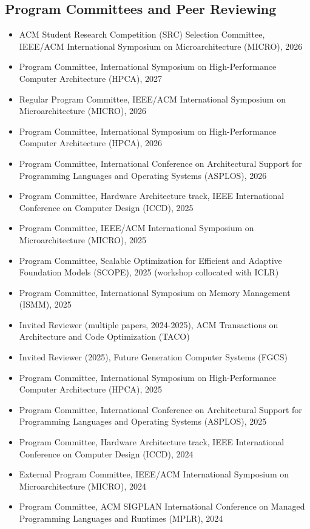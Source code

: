 \documentclass[singlecolumn,singlespace,11pt,a4paper]{article}
\begin{document}
\subsection*{Program Committees and Peer Reviewing}
\begin{itemize}
\item ACM Student Research Competition (SRC) Selection Committee, IEEE/ACM International Symposium on Microarchitecture (MICRO), 2026
\item Program Committee, International Symposium on High-Performance Computer Architecture (HPCA), 2027
\item Regular Program Committee, IEEE/ACM International Symposium on Microarchitecture (MICRO), 2026
\item Program Committee, International Symposium on High-Performance Computer Architecture (HPCA), 2026
\item Program Committee, International Conference on Architectural Support for Programming Languages and Operating Systems (ASPLOS), 2026
\item Program Committee, Hardware Architecture track, IEEE International Conference on Computer Design (ICCD), 2025 
\item Program Committee, IEEE/ACM International Symposium on Microarchitecture (MICRO), 2025
\item Program Committee, Scalable Optimization for Efficient and Adaptive Foundation Models (SCOPE), 2025 (workshop collocated with ICLR)
\item Program Committee, International Symposium on Memory Management (ISMM), 2025
\item Invited Reviewer (multiple papers, 2024-2025), ACM Transactions on Architecture and Code Optimization (TACO)
\item Invited Reviewer (2025), Future Generation Computer Systems (FGCS)
\item Program Committee, International Symposium on High-Performance Computer Architecture (HPCA), 2025
\item Program Committee, International Conference on Architectural Support for Programming Languages and Operating Systems (ASPLOS), 2025
\item Program Committee, Hardware Architecture track, IEEE International Conference on Computer Design (ICCD), 2024 
\item External Program Committee, IEEE/ACM International Symposium on Microarchitecture (MICRO), 2024
\item Program Committee, ACM SIGPLAN International Conference on Managed Programming Languages and Runtimes (MPLR), 2024

\end{itemize}
\end{document}
